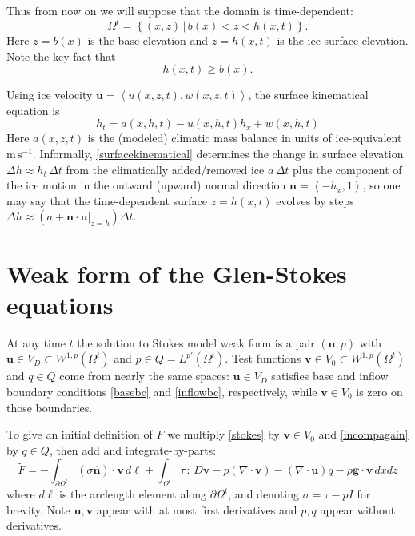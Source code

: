 \documentclass[letterpaper,final,12pt,reqno]{amsart}
\newcommand{\hbn}{\hat{\mathbf{n}}}
\newcommand{\bn}{\mathbf{n}}
\newcommand{\bu}{\mathbf{u}}
\newcommand{\bv}{\mathbf{v}}
\begin{document}
Thus from now on we will suppose that the domain is time-dependent:
\begin{equation}
\Omega^t = \left\{(x,z)\,\big|\, b(x) < z < h(x,t)\right\}.  \label{Omegat}
\end{equation}
Here $z=b(x)$ is the base elevation and $z=h(x,t)$ is the ice surface elevation.  Note the key fact that
\begin{equation}
h(x,t) \ge b(x).  \label{admissibility}
\end{equation}

Using ice velocity $\bu=\left<u(x,z,t),w(x,z,t)\right>$, the surface kinematical equation is
\begin{equation}
h_t = a(x,h,t) - u(x,h,t) h_x + w(x,h,t) \label{surfacekinematical}
\end{equation}
Here $a(x,z,t)$ is the (modeled) climatic mass balance in units of ice-equivalent $\text{m}\,\text{s}^{-1}$.  Informally, \eqref{surfacekinematical} determines the change in surface elevation $\Delta h \approx h_t\,\Delta t$ from the climatically added/removed ice $a\,\Delta t$ plus the component of the ice motion in the outward (upward) normal direction $\bn = \left<-h_x,1\right>$, so one may say that the time-dependent surface $z=h(x,t)$ evolves by steps $\Delta h \approx \left(a + \bn\cdot \bu|_{z=h}\right) \Delta t$.


\section{Weak form of the Glen-Stokes equations} \label{sec:weakformstokes}

At any time $t$ the solution to Stokes model weak form is a pair $(\bu,p)$ with $\bu\in V_D \subset W^{1,p}(\Omega^t)$ and $p \in Q=L^{p'}(\Omega^t)$.  Test functions $\bv\in V_0 \subset W^{1,p}(\Omega^t)$ and $q\in Q$ come from nearly the same spaces: $\bu\in V_D$ satisfies base and inflow boundary conditions \eqref{basebc} and \eqref{inflowbc}, respectively, while $\bv\in V_0$ is zero on those boundaries.

To give an initial definition of $F$ we multiply \eqref{stokes} by $\bv\in V_0$ and \eqref{incompagain} by $q\in Q$, then add and integrate-by-parts:
\begin{equation}
\tilde F = -\int_{\partial\Omega^t} (\sigma \hbn)\cdot \bv\,d\ell + \int_{\Omega^t} \tau \,:\,D\bv - p (\nabla \cdot \bv) - \left(\nabla \cdot \bu\right) q - \rho \mathbf{g} \cdot \bv \,dx dz \label{nonfunctwo}
\end{equation}
where $d\ell$ is the arclength element along $\partial\Omega^t$, and denoting $\sigma=\tau-pI$ for brevity.  Note $\bu,\bv$ appear with at most first derivatives and $p,q$ appear without derivatives.
\end{document}
